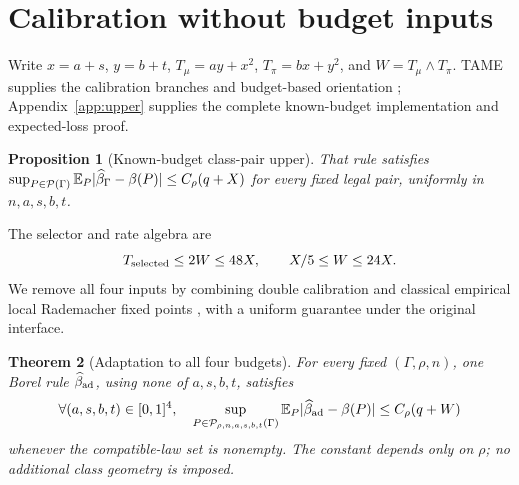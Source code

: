 \documentclass{article}
\newtheorem{theorem}{Theorem}
\newtheorem{proposition}[theorem]{Proposition}
\theoremstyle{definition}
\theoremstyle{remark}
\begin{document}
\section{Calibration without budget inputs}
\label{sec:upper}
Write \(x=a+s\), \(y=b+t\), \(T_\mu=ay+x^2\),
\(T_\pi=bx+y^2\), and \(W=T_\mu\wedge T_\pi\).
TAME supplies the calibration branches and budget-based orientation
\citep{gu2026optimalblackbox}; Appendix~\ref{app:upper} supplies the complete
known-budget implementation and expected-loss proof.
\begin{proposition}[Known-budget class-pair upper]
\label{prop:upper}
That rule satisfies
\(\sup_{P\in\mathcal P(\Gamma)}\mathbb E_P|\widehat\beta_\Gamma-\beta(P)|
\le C_\rho(q+X)\) for every fixed legal pair, uniformly in \(n,a,s,b,t\).
\end{proposition}
The selector and rate algebra are
\begin{equation}
 T_{\rm selected}\le2W\le48X,\qquad X/5\le W\le24X.
 \label{eq:selector-algebra}
\end{equation}
We remove all four inputs by combining double calibration
\citep[Section 4.1]{liu2023doublecalibration} and classical empirical local
Rademacher fixed points \citep{bartlett2005local}, with a uniform guarantee
under the original interface.

\begin{theorem}[Adaptation to all four budgets]
\label{thm:approximation-main}
For every fixed \((\Gamma,\rho,n)\), one Borel rule
\(\widehat\beta_{\rm ad}\), using none of \(a,s,b,t\), satisfies
\[
 \forall(a,s,b,t)\in[0,1]^4,\quad
 \sup_{P\in\mathcal P_{\rho,n,a,s,b,t}(\Gamma)}
 \mathbb E_P|\widehat\beta_{\rm ad}-\beta(P)|\le C_\rho(q+W)
\]
whenever the compatible-law set is nonempty. The constant depends
only on \(\rho\); no additional class geometry is imposed.
\end{theorem}
\end{document}
